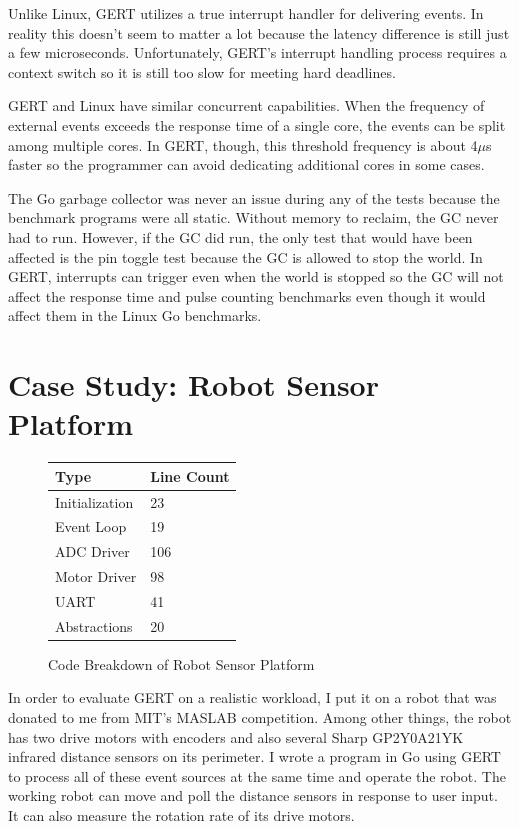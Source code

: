 Unlike Linux, GERT utilizes a true interrupt handler for delivering events.
In reality this doesn't seem to matter a lot because the latency difference
is still just a few microseconds. Unfortunately, GERT's interrupt handling
process requires a context switch so it is still too slow for meeting hard
deadlines.

GERT and Linux have similar concurrent capabilities. When the frequency of external
events exceeds the response time of a single core, the events can be split among
multiple cores. In GERT, though, this threshold frequency is about 4$\mu$s faster
so the programmer can avoid dedicating additional cores in some cases.

The Go garbage collector was never an issue during any of the tests because the
benchmark programs were all static. Without memory to reclaim, the GC never
had to run. However, if the GC did run, the only test that would have been affected is
the pin toggle test because the GC is allowed to stop the world. In GERT, interrupts
can trigger even when the world is stopped so the GC will not affect the response time
and pulse counting benchmarks even though it would affect them in the Linux Go benchmarks.

\section{Case Study: Robot Sensor Platform} \label{sec:robot}

\begin{figure}[h]
\begin{center}
  \begin{tabular}{ | l | l |}
    \hline
    Type & Line Count \\ \hline
    Initialization & 23 \\ \hline
    Event Loop & 19 \\ \hline
    ADC Driver & 106 \\ \hline
    Motor Driver & 98 \\ \hline
    UART & 41 \\ \hline
    Abstractions & 20 \\
    \hline
  \end{tabular}
\end{center}
  \caption{Code Breakdown of Robot Sensor Platform} \label{fig:robot_code}
\end{figure}

In order to evaluate GERT on a realistic workload, I put it on a robot that was
donated to me from MIT's MASLAB competition. Among other things, the robot has two drive
motors with encoders and also several Sharp GP2Y0A21YK infrared distance sensors on its perimeter.
I wrote a program in Go using GERT to process all of these event sources at the same time
and operate the robot. The working robot can move and poll the distance sensors in response to user input.
It can also measure the rotation rate of its drive motors.

